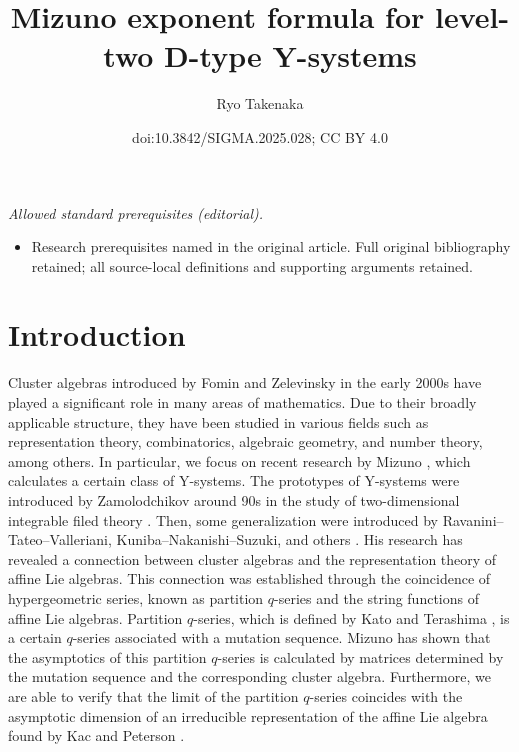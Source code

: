 \documentclass[10pt,a4paper]{amsart}
\title{Mizuno exponent formula for level-two D-type Y-systems}
\author{Ryo Takenaka}
\date{doi:10.3842/SIGMA.2025.028; CC BY 4.0}
\numberwithin{equation}{section}
\begin{document}
\maketitle
\noindent\textit{Allowed standard prerequisites (editorial).}\begin{itemize}
\item Research prerequisites named in the original article. Full original bibliography retained; all source-local definitions and supporting arguments retained.
\end{itemize}\medskip
\section{Introduction}

Cluster algebras introduced by Fomin and Zelevinsky in the early 2000s \cite{FZ,FZ2} have played a significant role in many areas of mathematics.
Due to their broadly applicable structure, they have been studied in various fields such as representation theory, combinatorics, algebraic geometry, and number theory, among others.
In particular, we focus on recent research by Mizuno \cite{M}, which calculates a certain class of Y-systems.
The prototypes of Y-systems were introduced by Zamolodchikov around 90s in the study of two-dimensional integrable filed theory \cite{Z}.
Then, some generalization were introduced by Ravanini--Tateo--Valleriani, Kuniba--Nakanishi--Suzuki, and others \cite{KNS0, RTV}.
His research has revealed a connection between cluster algebras and the representation theory of affine Lie algebras.
This connection was established through the coincidence of hypergeometric series, known as partition $q$-series and the string functions of affine Lie algebras.
Partition $q$-series, which is defined by Kato and Terashima \cite{KT}, is a certain $q$-series associated with a mutation sequence.
Mizuno has shown that the asymptotics of this partition $q$-series is calculated by matrices determined by the mutation sequence and the corresponding cluster algebra.
Furthermore, we are able to verify that the limit of the partition $q$-series coincides with the asymptotic dimension of an irreducible representation of the affine Lie algebra found by Kac and Peterson \cite{KP}.
\end{document}

